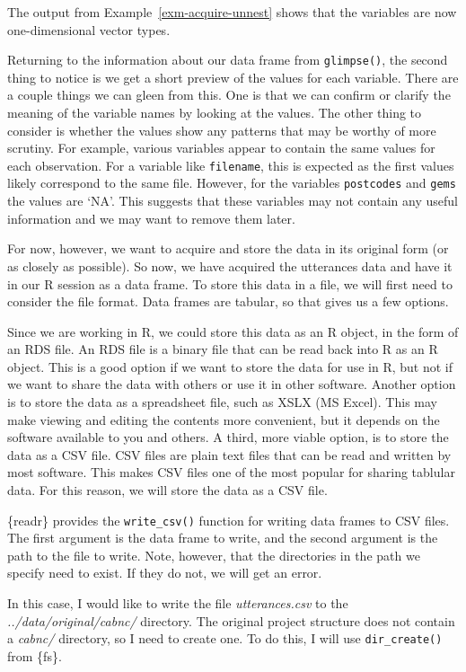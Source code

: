 \documentclass[
  letterpaper,
]{latex/krantz}
\theoremstyle{definition}
\theoremstyle{remark}
\begin{document}
The output from Example~\ref{exm-acquire-unnest} shows that the
variables are now one-dimensional vector types.

Returning to the information about our data frame from
\texttt{glimpse()}, the second thing to notice is we get a short preview
of the values for each variable. There are a couple things we can gleen
from this. One is that we can confirm or clarify the meaning of the
variable names by looking at the values. The other thing to consider is
whether the values show any patterns that may be worthy of more
scrutiny. For example, various variables appear to contain the same
values for each observation. For a variable like \texttt{filename}, this
is expected as the first values likely correspond to the same file.
However, for the variables \texttt{postcodes} and \texttt{gems} the
values are `NA'. This suggests that these variables may not contain any
useful information and we may want to remove them later.

For now, however, we want to acquire and store the data in its original
form (or as closely as possible). So now, we have acquired the
utterances data and have it in our R session as a data frame. To store
this data in a file, we will first need to consider the file format.
Data frames are tabular, so that gives us a few options.

Since we are working in R, we could store this data as an R object, in
the form of an RDS file. An RDS file is a binary file that can be read
back into R as an R object. This is a good option if we want to store
the data for use in R, but not if we want to share the data with others
or use it in other software. Another option is to store the data as a
spreadsheet file, such as XSLX (MS Excel). This may make viewing and
editing the contents more convenient, but it depends on the software
available to you and others. A third, more viable option, is to store
the data as a CSV file. CSV files are plain text files that can be read
and written by most software. This makes CSV files one of the most
popular for sharing tablular data. For this reason, we will store the
data as a CSV file.

\{readr\} provides the \texttt{write\_csv()} function for writing data
frames to CSV files. The first argument is the data frame to write, and
the second argument is the path to the file to write. Note, however,
that the directories in the path we specify need to exist. If they do
not, we will get an error.

In this case, I would like to write the file \emph{utterances.csv} to
the \emph{../data/original/cabnc/} directory. The original project
structure does not contain a \emph{cabnc/} directory, so I need to
create one. To do this, I will use \texttt{dir\_create()} from \{fs\}.
\end{document}
